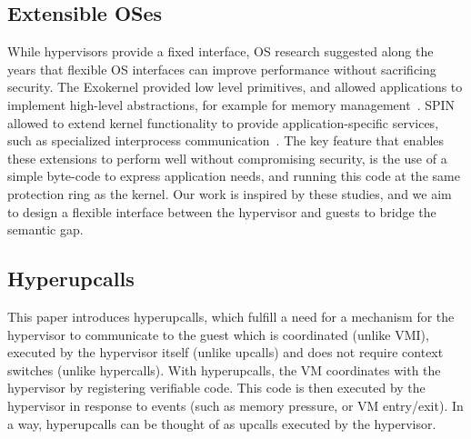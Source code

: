 \documentclass[11pt]{article}
\newcommand{\Hypercallback}{Hyperupcall\xspace{}}
\newcommand{\hypercallback}{hyperupcall\xspace{}}
\begin{document}
\subsection{Extensible OSes}
While hypervisors provide a fixed interface, OS research suggested along the years
that flexible OS interfaces can improve performance without sacrificing security. The Exokernel
provided low level primitives, and allowed applications to implement high-level abstractions,
for example for memory management~\cite{engler1995exokernel}. SPIN allowed to extend kernel
functionality to provide application-specific services, such as specialized interprocess
communication~\cite{bershad1995extensibility}. The key feature that enables these extensions
to perform well without compromising security, is the use of a simple byte-code to express
application needs, and running this code at the same protection ring as the kernel.
Our work is inspired by these studies, and we aim to design a flexible interface between the hypervisor
and guests to bridge the semantic gap.

\subsection{\Hypercallback{}s}

This paper introduces \hypercallback{}s, which fulfill a need for a mechanism
for the hypervisor to communicate to the guest which is coordinated (unlike VMI),
executed by the hypervisor itself (unlike upcalls) and does not require context switches (unlike hypercalls).
With \hypercallback{}s, the VM coordinates with the hypervisor by registering verifiable code. 
This code is then executed by the hypervisor in response to events (such as memory pressure, or VM entry/exit). In
a way, \hypercallback{}s can be thought of as upcalls executed by the hypervisor.
\end{document}

